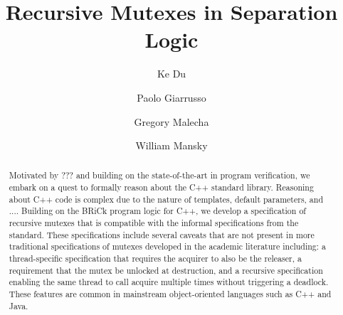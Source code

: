 \documentclass[sigplan,screen]{acmart}
\begin{document}
\title{Recursive Mutexes in Separation Logic}

\author{Ke Du}

\author{Paolo Giarrusso}

\author{Gregory Malecha}

\author{William Mansky}

\renewcommand{\shortauthors}{Du et al.}

\newcommand{\mutexR}{\ensuremath{\mathsf{rmutex}}}

\begin{abstract}
  Motivated by ??? and building on the state-of-the-art in program verification, we embark on a quest to formally reason about the C++ standard library.
  Reasoning about C++ code is complex due to the nature of templates, default parameters, and ....
  Building on the BRiCk program logic for C++, we develop a specification of recursive mutexes that is compatible with the informal specifications from the standard.
  These specifications include several caveats that are not present in more traditional specifications of mutexes developed in the academic literature including: a thread-specific specification that requires the acquirer to also be the releaser, a requirement that the mutex be unlocked at destruction, and a recursive specification enabling the same thread to call acquire multiple times without triggering a deadlock.
  These features are common in mainstream object-oriented languages such as C++ and Java.


\end{abstract}
\end{document}
